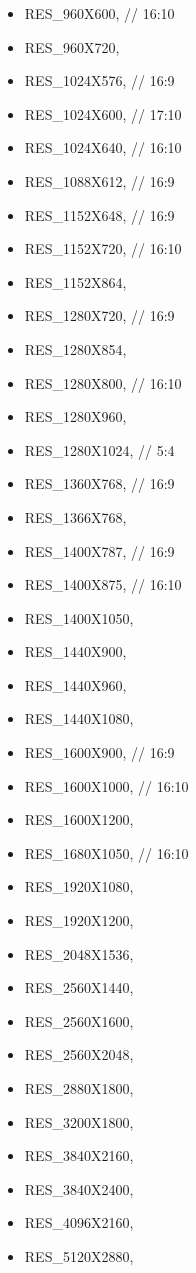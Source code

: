 \begin{itemize}
 \item       RES\_960X600,	// 16:10
 \item       RES\_960X720,
 \item       RES\_1024X576,	// 16:9
 \item       RES\_1024X600,	// 17:10
 \item       RES\_1024X640,	// 16:10
 \item       RES\_1088X612,	// 16:9
 \item       RES\_1152X648,	// 16:9
 \item       RES\_1152X720,	// 16:10
 \item       RES\_1152X864,
 \item       RES\_1280X720,	// 16:9
 \item       RES\_1280X854,
 \item       RES\_1280X800,	// 16:10
 \item       RES\_1280X960,
 \item       RES\_1280X1024,	// 5:4
 \item       RES\_1360X768,	// 16:9
 \item       RES\_1366X768,
 \item       RES\_1400X787,	// 16:9
 \item       RES\_1400X875,	// 16:10
 \item       RES\_1400X1050,
 \item       RES\_1440X900,
 \item       RES\_1440X960,
 \item       RES\_1440X1080,
  \item      RES\_1600X900,	// 16:9
 \item       RES\_1600X1000,	// 16:10
 \item       RES\_1600X1200,
 \item       RES\_1680X1050,	// 16:10
 \item       RES\_1920X1080,
 \item       RES\_1920X1200,
 \item       RES\_2048X1536,
 \item       RES\_2560X1440,
 \item       RES\_2560X1600,
 \item       RES\_2560X2048,
 \item       RES\_2880X1800,
 \item       RES\_3200X1800,
  \item      RES\_3840X2160,
 \item       RES\_3840X2400,
 \item       RES\_4096X2160,
  \item      RES\_5120X2880,
\end{itemize}
